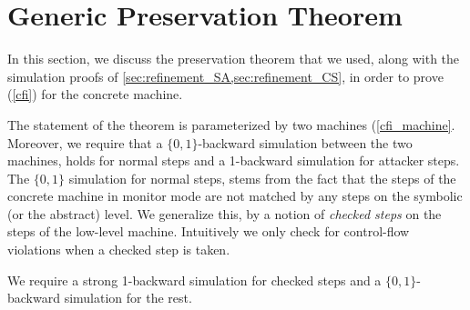 
\section{Generic Preservation Theorem}
\label{sec:cfi_preservation}

In this section, we discuss the preservation theorem that we used,
along with the simulation proofs of
\cref{sec:refinement_SA,sec:refinement_CS}, in order to prove \CFI
(\cref{cfi}) for the concrete machine.

The statement of the theorem is parameterized by two \CFI machines
(\cref{cfi_machine}. Moreover, we require that a $\lbrace 0,1
\rbrace$-backward simulation between the two machines, holds for
normal steps and a 1-backward simulation for attacker steps.  The
$\lbrace 0,1 \rbrace$ simulation for normal steps, stems from the fact
that the steps of the concrete machine in monitor mode are not matched
by any steps on the symbolic (or the abstract) level. We generalize
this, by a notion of \emph{checked steps} on the steps of the
low-level machine. Intuitively we only check for control-flow
violations when a checked step is taken.

We require a strong 1-backward simulation for checked steps and
a $\lbrace 0,1 \rbrace$-backward simulation for the rest.


